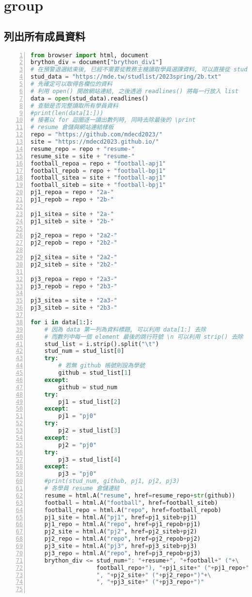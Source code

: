 \chapter{group}

\section{列出所有成員資料}
\begin{lstlisting}[language=Python, frame=single, numbers=left, captionpos=b, basicstyle=\ttfamily\small, showstringspaces=false, breaklines=true, tabsize=4, xleftmargin=15pt]
from browser import html, document
brython_div = document["brython_div1"]
# 在預警退選結束後, 已經不需要從教務主機讀取學員選課資料, 可以直接從 studlist 取得
stud_data = "https://mde.tw/studlist/2023spring/2b.txt"
# 先確定可以取得各欄位的資料
# 利用 open() 開啟網站連結, 之後透過 readlines() 將每一行放入 list
data = open(stud_data).readlines()
# 查驗是否完整讀取所有學員資料
#print(len(data[1:]))
# 接著以 for 迴圈逐一讀出數列時, 同時去除最後的 \print
# resume 倉儲與網站連結樣板
repo = "https://github.com/mdecd2023/"
site = "https://mdecd2023.github.io/"
resume_repo = repo + "resume-"
resume_site = site + "resume-"
football_repoa = repo + "football-apj1"
football_repob = repo + "football-bpj1"
football_sitea = site + "football-apj1"
football_siteb = site + "football-bpj1"
pj1_repoa = repo + "2a-"
pj1_repob = repo + "2b-"

pj1_sitea = site + "2a-"
pj1_siteb = site + "2b-"

pj2_repoa = repo + "2a2-"
pj2_repob = repo + "2b2-"

pj2_sitea = site + "2a2-"
pj2_siteb = site + "2b2-"

pj3_repoa = repo + "2a3-"
pj3_repob = repo + "2b3-"

pj3_sitea = site + "2a3-"
pj3_siteb = site + "2b3-"

for i in data[1:]:
    # 因為 data 第一列為資料標題, 可以利用 data[1:] 去除
    # 而數列中每一個 element 最後的跳行符號 \n 可以利用 strip() 去除
    stud_list = i.strip().split("\t")
    stud_num = stud_list[0]
    try:
        # 若無 github 帳號則設為學號
        github = stud_list[1]
    except:
        github = stud_num
    try:
        pj1 = stud_list[2]
    except:
        pj1 = "pj0"
    try:
        pj2 = stud_list[3]
    except:
        pj2 = "pj0"
    try:
        pj3 = stud_list[4]
    except:
        pj3 = "pj0"
    #print(stud_num, github, pj1, pj2, pj3)
    # 各學員 resume 倉儲連結
    resume = html.A("resume", href=resume_repo+str(github))
    football = html.A("football", href=football_siteb)
    football_repo = html.A("repo", href=football_repob)
    pj1_site = html.A("pj1", href=pj1_siteb+pj1)
    pj1_repo = html.A("repo", href=pj1_repob+pj1)
    pj2_site = html.A("pj2", href=pj2_siteb+pj2)
    pj2_repo = html.A("repo", href=pj2_repob+pj2)
    pj3_site = html.A("pj3", href=pj3_siteb+pj3)
    pj3_repo = html.A("repo", href=pj3_repob+pj3)
    brython_div <= stud_num+": "+resume+", "+football+" ("+\
                   football_repo+"), "+pj1_site+" ("+pj1_repo+")"+\
                   ", "+pj2_site+" ("+pj2_repo+")"+\
                   ", "+pj3_site+" ("+pj3_repo+")"
 

\end{lstlisting}

